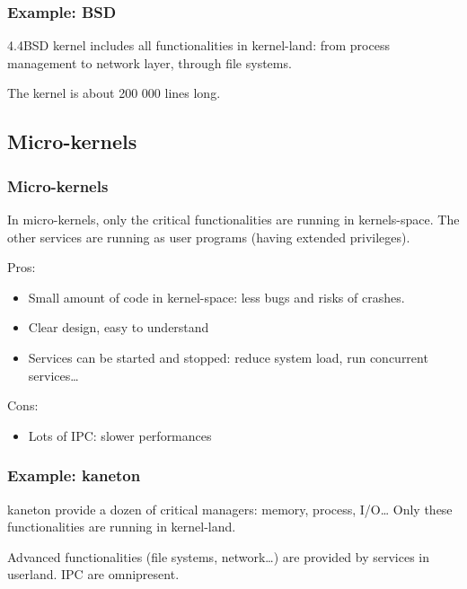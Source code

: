 %
%

\begin{frame}
  \frametitle{Example: BSD}

  4.4BSD kernel includes all functionalities in kernel-land: from process management to network layer, through file systems.

  \begin{center}
  \end{center}

  The kernel is about 200 000 lines long.

\end{frame} 

%
%

\subsection{Micro-kernels}

%
%

\begin{frame}
  \frametitle{Micro-kernels}

  In micro-kernels, only the critical functionalities are running in kernels-space. The other services are running as user programs (having extended privileges).

  \-

  Pros:

  \begin{itemize}
  \item
    Small amount of code in kernel-space: less bugs and risks of crashes.
  \item
    Clear design, easy to understand
  \item
    Services can be started and stopped: reduce system load, run concurrent services\ldots
  \end{itemize}

  \-

  Cons:

  \begin{itemize}
  \item
    Lots of IPC: slower performances
  \end{itemize}

\end{frame}

%
%

\begin{frame}
  \frametitle{Example: kaneton}

  kaneton provide a dozen of critical managers: memory, process,
  I/O\ldots{} Only these functionalities are running in kernel-land.

  \begin{center}
  \end{center}

  Advanced functionalities (file systems, network\ldots) are provided by services in userland. IPC are omnipresent.

\end{frame}

